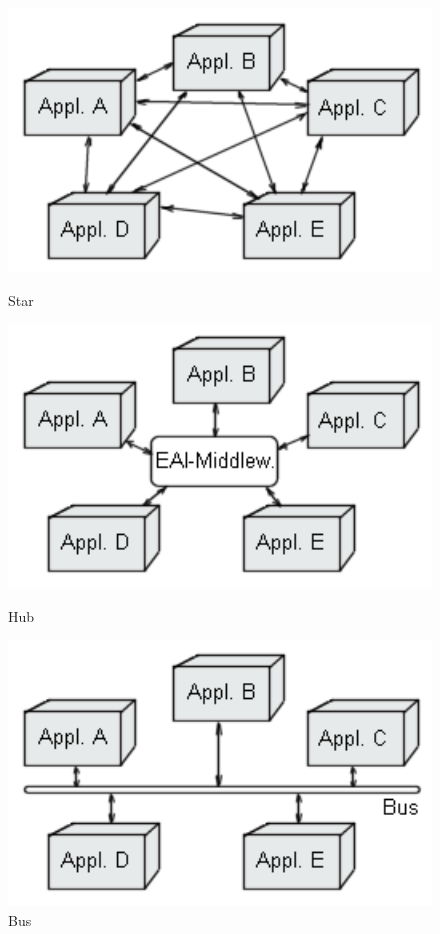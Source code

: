 \documentclass[12pt]{article}
\begin{document}
\begin{figure}[here!]
\centering
\begin{minipage}[h]{0.3\textwidth}
\centering
    \includegraphics[width=1.0\textwidth]{images/eai0.png}
    \caption{Star \cite{thorstenhorn}}
    \label{fig:eai0}
\end{minipage}
\begin{minipage}[h]{0.3\textwidth}
\centering
    \includegraphics[width=1.0\textwidth]{images/eai1.png}
    \caption{Hub \cite{thorstenhorn}}
    \label{fig:eai1}
\end{minipage}
\begin{minipage}[h]{0.3\textwidth}
\centering
    \includegraphics[width=1.0\textwidth]{images/eai2.png}
    \caption{Bus \cite{thorstenhorn}}
    \label{fig:eai2}
\end{minipage}
\end{figure}
\end{document}
